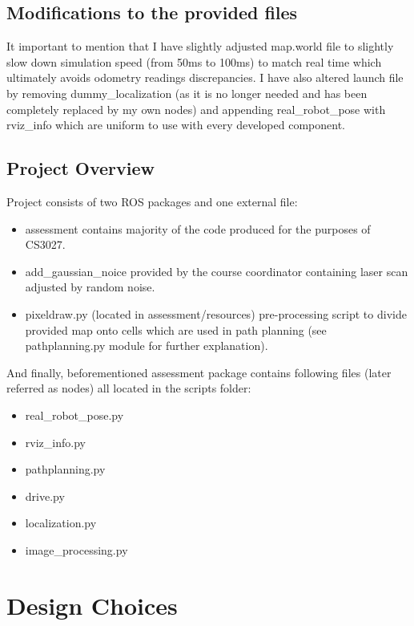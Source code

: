 \documentclass[a4paper]{article}
\begin{document}
\subsection{Modifications to the provided files}
\label{sec:modifications}

It important to mention that I have slightly adjusted map.world file to slightly slow down simulation speed (from 50ms to 100ms) to match real time which ultimately avoids odometry readings discrepancies.
I have also altered launch file by removing dummy\_localization (as it is no longer needed and has been completely replaced by my own nodes) and appending real\_robot\_pose with rviz\_info which are uniform to use with every developed component.

\subsection{Project Overview}
\label{sec:overview}

Project consists of two ROS packages and one external file:
\begin{itemize}
    \setlength\itemsep{0.1em}
    \item assessment \textendash{} contains majority of the code produced for the purposes of CS3027.
    \item add\_gaussian\_noice \textendash{} provided by the course coordinator containing laser scan adjusted by random noise.
    \item pixeldraw.py (located in assessment/resources) \textendash{} pre-processing script to divide provided map onto cells which are used in path planning (see pathplanning.py module for further explanation).
\end{itemize}
And finally, beforementioned assessment package contains following files (later referred as nodes) \textendash{} all located in the scripts folder:
\begin{itemize}
    \setlength\itemsep{0.1em}
    \item real\_robot\_pose.py
    \item rviz\_info.py
    \item pathplanning.py
    \item drive.py
    \item localization.py
    \item image\_processing.py
\end{itemize}

\section{Design Choices}
\end{document}
